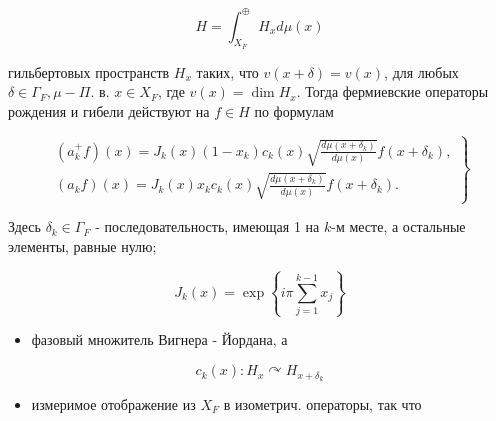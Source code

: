 \documentclass[10pt]{article}
\begin{document}
\[

H=\int_{X_{F}}^{\oplus} H_{x} d \mu(x)

\]



гильбертовых пространств $H_{x}$ таких, что $v(x+\delta)=v(x)$, для любых $\delta \in \Gamma_{F}, \mu-\Pi$. в. $x \in X_{F}$, где $v(x)=\operatorname{dim} H_{x}$. Тогда фермиевские операторы рождения и гибели действуют на $f \in H$ по формулам



\[

\left.\begin{array}{l}

\left(a_{k}^{+} f\right)(x)=J_{k}(x)\left(1-x_{k}\right) c_{k}(x) \sqrt{\frac{d \mu\left(x+\delta_{k}\right)}{d \mu(x)}} f\left(x+\delta_{k}\right), \\

\left(a_{k} f\right)(x)=J_{k}(x) x_{k} c_{k}(x) \sqrt{\frac{d \mu\left(x+\delta_{k}\right)}{d \mu(x)}} f\left(x+\delta_{k}\right) .

\end{array}\right\}

\]



Здесь $\delta_{k} \in \Gamma_{F}$ - последовательность, имеющая 1 на $k$-м месте, а остальные элементы, равные нулю;



\[

J_{k}(x)=\exp \left\{i \pi \sum_{j=1}^{k-1} x_{j}\right\}

\]



\begin{itemize}

  \item фазовый множитель Вигнера - Йордана, а

\end{itemize}



\[

c_{k}(x): H_{x} \curvearrowright H_{x+\delta_{k}}

\]



\begin{itemize}

  \item измеримое отображение из $X_{F}$ в изометрич. операторы, так что

\end{itemize}
\end{document}
